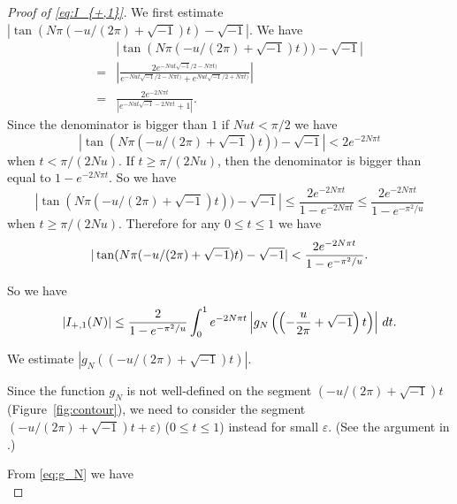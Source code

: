 \documentclass[a4paper]{amsart}
\theoremstyle{plain}
\theoremstyle{definition}
\theoremstyle{remark}
\numberwithin{equation}{section}
\begin{document}
\begin{proof}[Proof of \eqref{eq:I_{+,1}}]
We first estimate $|\tan(N\pi (-u/(2\pi)+\sqrt{-1})t)-\sqrt{-1}|$.
We have
\begin{equation*}
\begin{split}
  &
  |\tan(N\pi (-u/(2\pi)+\sqrt{-1})t))-\sqrt{-1}|
  \\
  =&
  \left|
    \frac{2e^{-Nut\sqrt{-1}/2-N\pi t)}}
         {e^{-Nut\sqrt{-1}/2-N\pi t)}+e^{Nut\sqrt{-1}/2+N\pi t)}}
  \right|
  \\
  =&
  \frac{2e^{-2N\pi t}}
  {\left|e^{-Nut\sqrt{-1}-2N\pi t}+1\right|}.
\end{split}
\end{equation*}
Since the denominator is bigger than $1$ if $Nut<\pi/2$ we have
\begin{equation*}
  |\tan(N\pi (-u/(2\pi)+\sqrt{-1})t))-\sqrt{-1}|
  <
  2e^{-2N\pi t}
\end{equation*}
when $t<\pi/(2Nu)$.
If $t\ge\pi/(2Nu)$, then the denominator is bigger than equal to $1-e^{-2N\pi t}$.
So we have
\begin{equation*}
  |\tan(N\pi (-u/(2\pi)+\sqrt{-1})t))-\sqrt{-1}|
  \le
  \frac{2e^{-2N\pi t}}{1-e^{-2N\pi t}}
  \le
  \frac{2e^{-2N\pi t}}{1-e^{-\pi^2/u}}
\end{equation*}
when $t\ge\pi/(2Nu)$.
Therefore for any $0\le t\le 1$ we have
\begin{equation}\label{eq:I_{+,1}tan}
  |\tan(N\pi (-u/(2\pi)+\sqrt{-1})t)-\sqrt{-1}|
  <
  \frac{2e^{-2N\pi t}}{1-e^{-\pi^2/u}}.
\end{equation}
\par
So we have
\begin{equation}\label{eq:I_{+,1}integral}
  \left|I_{+,1}(N)\right|
  \le
  \frac{2}{1-e^{-\pi^2/u}}
  \int_{0}^{1}
  e^{-2N\pi t}
  \left|
    g_N\left(\left(-\frac{u}{2\pi}+\sqrt{-1}\right)t\right)
  \right|
  \,dt.
\end{equation}
\par
We estimate $|g_N((-u/(2\pi)+\sqrt{-1})t)|$.
\par
Since the function $g_N$ is not well-defined on the segment $(-u/(2\pi)+\sqrt{-1})t$ (Figure~\ref{fig:contour}), we need to consider the segment $(-u/(2\pi)+\sqrt{-1})t+\varepsilon)$ ($0\le t\le1$) instead for small $\varepsilon$.
(See the argument in \cite[Page~534]{Andersen/Hansen:JKNOT2006}.)
\par
From \eqref{eq:g_N} we have
\begin{equation*}

\end{equation*}
\end{proof}
\end{document}
